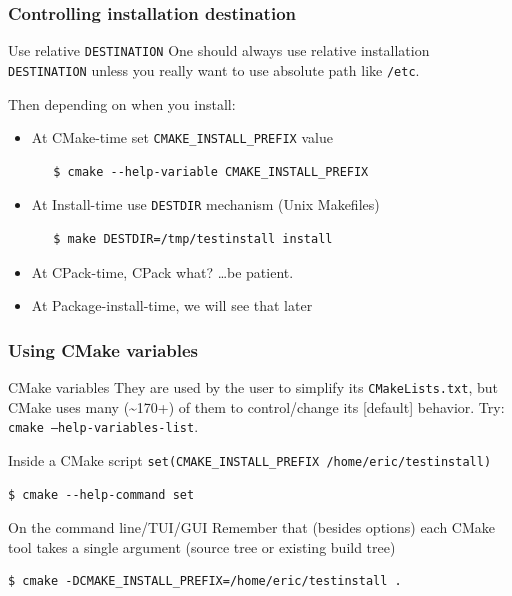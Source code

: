 \documentclass[compress,slidestop,table
              ]
               {beamer}
\newcommand{\fname}[1]{\texttt{#1}}
\begin{document}
\begin{frame}[fragile]
\frametitle{Controlling installation destination}
\begin{alertblock}{Use relative \lstinline!DESTINATION!}
One should always use relative installation \lstinline!DESTINATION!
unless you really want to use absolute path like \fname{/etc}.
\end{alertblock}
Then depending on when you install:
\begin{itemize}
\pause
\item At \textcolor{cmaketimec}{CMake-time} set \lstinline!CMAKE_INSTALL_PREFIX! value

     \begin{Verbatim}
   $ cmake --help-variable CMAKE_INSTALL_PREFIX
     \end{Verbatim}
\pause
\item At \textcolor{installtimec}{Install-time} use \fname{DESTDIR} mechanism (Unix Makefiles)

      \begin{Verbatim}
   $ make DESTDIR=/tmp/testinstall install
      \end{Verbatim}
\pause
\item At \textcolor{cpacktimec}{CPack-time}, CPack what? \ldots be patient.
\item At \textcolor{installtimec}{Package-install-time}, we will see that later
\end{itemize}
\end{frame}


\begin{frame}[fragile]
\frametitle{Using CMake variables}
\begin{block}{CMake variables}
They are used by the user to simplify its \fname{CMakeLists.txt},
but CMake uses many (\textasciitilde 170+) of them to control/change its [default] behavior.
Try: \texttt{cmake --help-variables-list}.
\end{block}
\begin{block}{Inside a CMake script}
\lstinline!set(CMAKE_INSTALL_PREFIX /home/eric/testinstall)!
\begin{Verbatim}
$ cmake --help-command set
\end{Verbatim}
\end{block}
\begin{block}{On the command line/TUI/GUI}
Remember that (besides options) each CMake tool takes a single argument
(source tree or \alert{existing} build tree)
\begin{Verbatim}[fontsize=\scriptsize]
$ cmake -DCMAKE_INSTALL_PREFIX=/home/eric/testinstall .
\end{Verbatim}
\end{block}
\end{frame}
\end{document}
